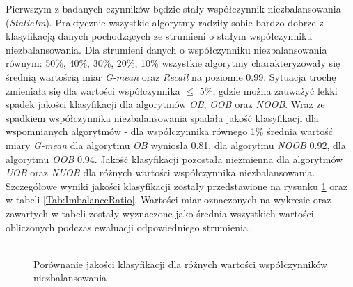 \noindent Pierwszym z badanych czynników będzie stały współczynnik niezbalansowania (\textit{StaticIm}). Praktycznie wszystkie algorytmy radziły sobie bardzo dobrze z klasyfikacją danych pochodzących ze strumieni o stałym współczynniku niezbalansowania. Dla strumieni danych o współczynniku niezbalansowania równym: 50\%, 40\%, 30\%, 20\%, 10\% wszystkie algorytmy charakteryzowały się średnią wartością miar \textit{G-mean} oraz \textit{Recall} na poziomie 0.99. Sytuacja trochę zmieniała się dla wartości współczynnika $\leq$ 5\%, gdzie można zauważyć lekki spadek jakości klasyfikacji dla algorytmów \textit{OB}, \textit{OOB} oraz \textit{NOOB}. Wraz ze spadkiem współczynnika niezbalansowania spadała jakość klasyfikacji dla wspomnianych algorytmów - dla współczynnika równego 1\% średnia wartość miary \textit{G-mean} dla algorytmu \textit{OB} wyniosła 0.81, dla algorytmu \textit{NOOB} 0.92, dla algorytmu \textit{OOB} 0.94. Jakość klasyfikacji pozostała niezmienna dla algorytmów \textit{UOB} oraz \textit{NUOB} dla różnych wartości współczynnika niezbalansowania. Szczegółowe wyniki jakości klasyfikacji zostały przedstawione na rysunku \ref{Figure:StaticImbalance} oraz w tabeli \ref{Tab:ImbalanceRatio}. Wartości miar oznaczonych na wykresie oraz zawartych w tabeli zostały wyznaczone jako średnia wszystkich wartości obliczonych podczas ewaluacji odpowiedniego strumienia.\\\\

\begin{figure}[h]
    \centering
    \qquad
    \caption{Porównanie jakości klasyfikacji dla różnych wartości współczynników niezbalansowania}\label{Figure:StaticImbalance}
\end{figure}

